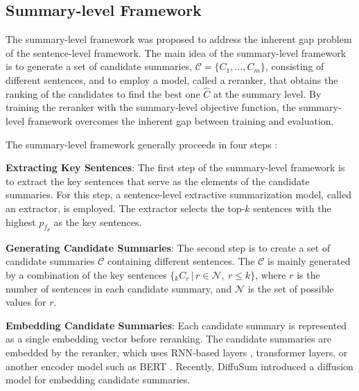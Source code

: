 
\subsection{Summary-level Framework}

The summary-level framework was proposed to address the inherent gap problem of the sentence-level framework. The main idea of the summary-level framework is to generate a set of candidate summaries, $\mathcal{C} = \{C_1, \ldots, C_m\}$, consisting of different sentences, and to employ a model, called a reranker, that obtains the ranking of the candidates to find the best one $\hat{C}$ at the summary level. By training the reranker with the summary-level objective function, the summary-level framework overcomes the inherent gap between training and evaluation.

The summary-level framework generally proceeds in four steps \citep{narayan-etal-2018-ranking, zhong-etal-2020-extractive, an-etal-2022-colo}:

\noindent
\textbf{Extracting Key Sentences}: The first step of the summary-level framework is to extract the key sentences that serve as the elements of the candidate summaries. For this step, a sentence-level extractive summarization model, called an extractor, is employed. The extractor selects the top-$k$ sentences with the highest $p_{f_{\theta}}$ as the key sentences.

\noindent
\textbf{Generating Candidate Summaries}: The second step is to create a set of candidate summaries $\mathcal{C}$ containing different sentences. The $\mathcal{C}$ is mainly generated by a combination of the key sentences $\{{}_{k} C_r \,|\, r \in \mathcal{N},\ r \leq k\}$, where $r$ is the number of sentences in each candidate summary, and $\mathcal{N}$ is the set of possible values for $r$.

\noindent
\textbf{Embedding Candidate Summaries}: Each candidate summary is represented as a single embedding vector before reranking. The candidate summaries are embedded by the reranker, which uses RNN-based layers \citep{narayan-etal-2018-ranking}, transformer layers, or another encoder model \citep{zhong-etal-2020-extractive} such as BERT \citep{devlin-etal-2019-bert}. Recently, DiffuSum \citep{zhang-etal-2023-diffusum} introduced a diffusion model for embedding candidate summaries.

